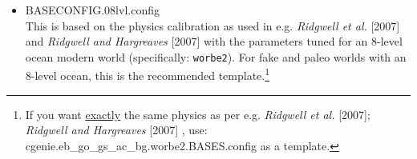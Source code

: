 \documentclass[11pt,fleqn]{book} %
\begin{document}
\begin{itemize}[noitemsep]

\vspace{2mm}
\item \textsf{\small BASECONFIG.08lvl.config}
\vspace{1mm}
\\This is based on the physics calibration as used in e.g. \textit{Ridgwell et al.} [2007] and \textit{Ridgwell and Hargreaves} [2007] with the parameters tuned for an 8-level ocean modern world (specifically: \texttt{worbe2}). For fake and paleo worlds with an 8-level ocean, this is the recommended template.\footnote{If you want \uline{exactly} the same physics as per e.g. \textit{Ridgwell et al.} [2007];  \textit{Ridgwell and Hargreaves} [2007] , use: \linebreak\textsf{\footnotesize cgenie.eb\_go\_gs\_ac\_bg.worbe2.BASES.config} as a template.}

\pagebreak


\end{itemize}
\end{document}
